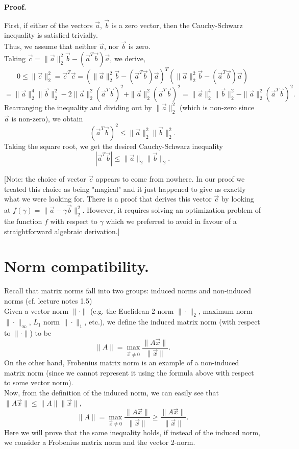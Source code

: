 \documentclass{article}
\newcommand{\bva}{\vec a}
\newcommand{\bvb}{\vec b}
\newcommand{\bvc}{\vec c}
\newcommand{\norm}[1]{\|#1\|}
\newcommand{\normII}[1]{\norm{#1}_2}
\begin{document}
\textbf{Proof.}

First, if either of the vectors $\vec a$,  $\vec b$ is a zero vector, then the Cauchy-Schwarz inequality is satisfied trivially.\\
Thus, we assume that neither $\bva$, nor $\bvb$ is zero.\\
Taking $\bvc = \normII{\bva}^2 \bvb - (\bva^T \bvb)\bva$, we derive,
\[ 0 \le \normII{\bvc}^2 = \bvc^T \bvc = (\normII{\bva}^2\bvb - (\bva^T \bvb)\bva)^T (\normII{\bva}^2\bvb - (\bva^T \bvb)\bva) \]
\[ = \normII{\bva}^4\normII{\bvb}^2 - 2\normII{\bva}^2 (\bva^T \bvb)^2 + \normII{\bva}^2 (\bva^T \bvb)^2
= \normII{\bva}^4 \normII{\bvb}^2 - \normII{\bva}^2 (\bva^T \bvb)^2. \]
Rearranging the inequality and dividing out by $\normII{\bva}^2$ (which is non-zero since $\bva$ is non-zero), we obtain
\[ (\bva^T \bvb)^2 \le \normII{\bva}^2 \normII{\bvb}^2. \]
Taking the square root, we get the desired Cauchy-Schwarz inequality
\[ |\bva^T \bvb| \le \normII{\bva} \normII{\bvb}. \]

[Note: the choice of vector $\vec c$ appears to come from nowhere. In our proof we treated this choice as being "magical" and it just happened to give us exactly what we were looking for. There is a proof that derives this vector $\vec c$ by looking at $f(\gamma) = \normII{\vec a - \gamma \vec b}^2$. However, it requires solving an optimization problem of the function $f$ with respect to $\gamma$ which we preferred to avoid in favour of a straightforward algebraic derivation.]

\section*{Norm compatibility.}
Recall that matrix norms fall into two groups: induced norms and non-induced norms (cf. lecture notes 1.5)\\
Given a vector norm $\norm{\cdot}$ (e.g. the Euclidean 2-norm $\normII{\cdot}$, maximum norm $\norm{\cdot}_\infty$, $L_1$ norm $\norm{\cdot}_1$, etc.), we define the induced matrix norm (with respect to $\norm{\cdot}$) to be
\[ \norm{A} = \max_{\vec x \ne 0} \frac{\norm{A\vec x}}{\norm{\vec{x}}}. \]
On the other hand, Frobenius matrix norm is an example of a non-induced matrix norm (since we cannot represent it using the formula above with respect to some vector norm).\\
Now, from the definition of the induced norm, we can easily see that
$\norm{A \vec x} \le \norm{A}\norm{\vec x}$,
\[  \norm{A} = \max_{\vec x \ne 0} \frac{\norm{A\vec x}}{\norm{\vec{x}}} \ge \frac{\norm{A\vec x}}{\norm{\vec{x}}}. \]
Here we will prove that the same inequality holds, if instead of the induced norm, we consider a Frobenius matrix norm and the vector 2-norm.
\\
\end{document}

